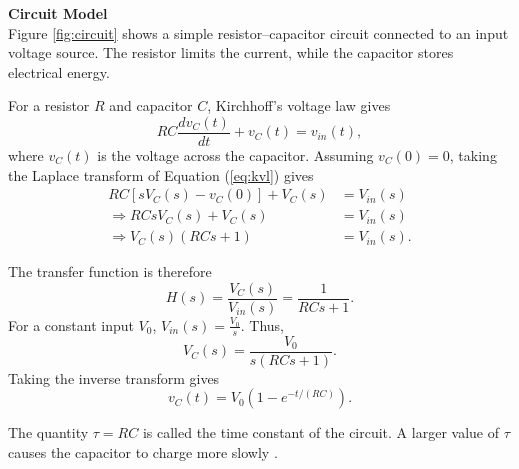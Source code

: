 \documentclass{article}
\begin{document}
\textbf{Circuit Model} \\
Figure \ref{fig:circuit} shows a simple resistor--capacitor circuit connected to an input voltage source. The resistor limits the current, while the capacitor stores electrical energy. 

For a resistor $R$ and capacitor $C$, Kirchhoff's voltage law gives
\begin{equation}
    RC\frac{dv_{C}(t)}{dt} + v_{C}(t) = v_{in}(t), \label{eq:kvl}
\end{equation}
where $v_{C}(t)$ is the voltage across the capacitor. Assuming $v_{C}(0)=0$, taking the Laplace transform of Equation (\ref{eq:kvl}) gives
\begin{align}
    RC[sV_{C}(s) - v_{C}(0)] + V_{C}(s) &= V_{in}(s) \nonumber \\
    \Rightarrow RCsV_{C}(s) + V_{C}(s) &= V_{in}(s) \nonumber \\
    \Rightarrow V_{C}(s)(RCs + 1) &= V_{in}(s). \label{eq:laplace_rc}
\end{align}

The transfer function is therefore
\begin{equation}
    H(s) = \frac{V_{C}(s)}{V_{in}(s)} = \frac{1}{RCs+1}.
\end{equation}
For a constant input $V_0$, $V_{in}(s) = \frac{V_0}{s}$. Thus,
\begin{equation}
    V_{C}(s) = \frac{V_0}{s(RCs+1)}.
\end{equation}
Taking the inverse transform gives
\begin{equation}
    v_{C}(t) = V_0(1 - e^{-t/(RC)}). \label{eq:time_domain}
\end{equation}

The quantity $\tau = RC$ is called the time constant of the circuit. A larger value of $\tau$ causes the capacitor to charge more slowly \cite{ogata}.
\end{document}
